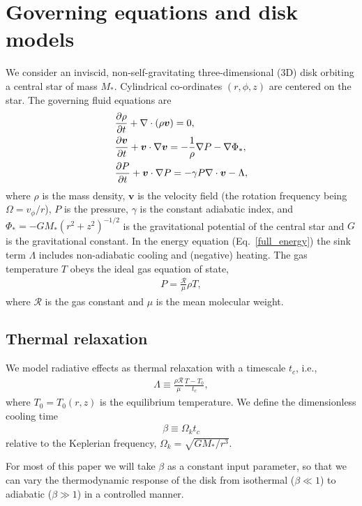 \section{Governing equations and disk models}\label{setup}
We consider  an inviscid, non-self-gravitating three-dimensional (3D)
disk orbiting a central star of mass $M_*$.  Cylindrical
co-ordinates $(r,\phi, z)$ are centered on the star. The governing fluid equations are
\begin{align}
  &\frac{\p\rho}{\p t} + \nabla\cdot{\left(\rho\bm{v}\right)} = 0,\label{full_mass}\\
  &\frac{\p\bm{v}}{\p t} + \bm{v}\cdot\nabla\bm{v} =
  -\frac{1}{\rho}\nabla P - \nabla\Phi_*,\\
  &\frac{\p P}{\p t} + \bm{v}\cdot\nabla P  = - \gamma P
  \nabla\cdot\bm{v} - \Lambda %
  , \label{full_energy}
\end{align}
where $\rho$ is the mass density, $\bm{v}$ is the velocity field (the
rotation frequency being $\Omega=v_\phi/r$), $P$
is the pressure, $\gamma$ is the constant adiabatic index, and $\Phi_*
= -GM_*(r^2 + z^2)^{-1/2}$ is the gravitational potential of the
central star and $G$ is the gravitational constant. 
In the energy equation (Eq.\ \ref{full_energy}) the sink term
$\Lambda$ includes non-adiabatic cooling and (negative) heating. 
The gas temperature $T$ obeys the ideal gas 
equation of state,  
\begin{align}
P = \frac{\mathcal{R}}{\mu}\rho T,
\end{align}
where $\mathcal{R}$ is the gas constant and $\mu$ is the mean molecular
weight.    

\subsection{Thermal relaxation}
We model radiative effects as thermal
relaxation with a timescale $t_c$, i.e.,
\begin{align}\label{thermal_relax}
  \Lambda  \equiv \frac{\rho\mathcal{R}}{\mu}\frac{T - T_0}{t_c},
\end{align}
where $T_0=T_0(r,z)$ is the equilibrium temperature.  We 
define the dimensionless cooling time 
\begin{align}\label{beta_def}
  \beta \equiv \Omega_k t_c
\end{align}
relative to the Keplerian frequency, $\Omega_k=\sqrt{GM_*/r^3}$.   

For most of this paper we will take $\beta$ as a constant input
parameter, so that we can vary the thermodynamic response of the
disk from isothermal ($\beta\ll 1$) to adiabatic ($\beta \gg 1$) in a
controlled manner. 

